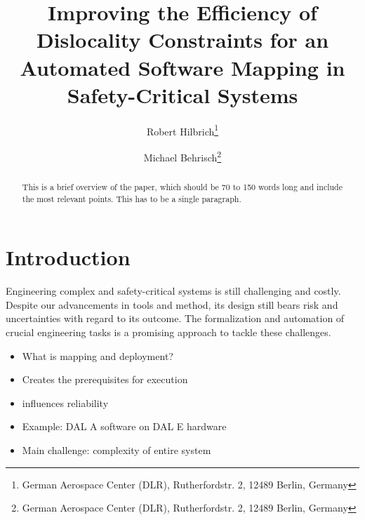 \documentclass[english,biblatex]{lni}
\begin{document}
\title[Improving the Efficiency of Dislocality Constraints]{Improving the Efficiency of Dislocality Constraints for an Automated Software Mapping in Safety-Critical Systems}
\author[Robert Hilbrich \and Michael Behrisch]
{Robert Hilbrich\footnote{German Aerospace Center (DLR), Rutherfordstr. 2, 12489 Berlin,
Germany } \and
Michael Behrisch\footnote{German Aerospace Center (DLR), Rutherfordstr. 2, 12489 Berlin,
Germany }}


\maketitle

\begin{abstract}
This is a brief overview of the paper, which should be 70 to 150 words long and
include the most relevant points. This has to be a single paragraph.
\end{abstract}
\section{Introduction}

Engineering complex and safety-critical systems is still challenging and costly.
Despite our advancements in tools and method, its design still bears risk and uncertainties with regard to its outcome.
The formalization and automation of crucial engineering tasks is a promising approach to tackle these challenges.

\begin{itemize}
\item What is mapping and deployment?
\item Creates the prerequisites for execution
\item influences reliability
\item Example: DAL A software on DAL E hardware
\item Main challenge: complexity of entire system
\end{itemize}
\end{document}
